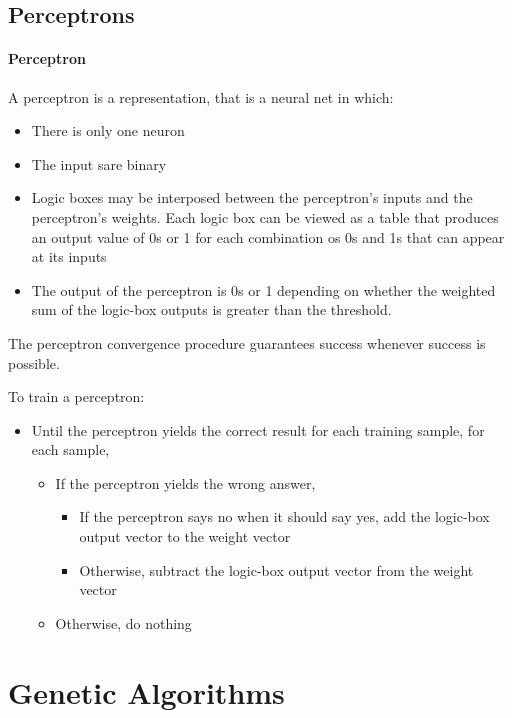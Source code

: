 \documentclass{article}
\begin{document}
\subsection{Perceptrons}

\paragraph{Perceptron} A perceptron is a representation, that is a
neural net in which:
\begin{itemize}
  \item There is only one neuron
  \item The input sare binary
  \item Logic boxes may be interposed between the perceptron's
    inputs and the perceptron's weights. Each logic box can be
    viewed as a table that produces an output value of 0s or 1 for
    each combination os 0s and 1s that can appear at its inputs
  \item The output of the perceptron is 0s or 1 depending on
    whether the weighted sum of the logic-box outputs is greater
    than the threshold.
\end{itemize}

The perceptron convergence procedure guarantees success whenever
success is possible.

To train a perceptron:
\begin{itemize}
  \item Until the perceptron yields the correct result for each
    training sample, for each sample,
    \begin{itemize}
      \item If the perceptron yields the wrong answer,
        \begin{itemize}
          \item If the perceptron says no when it should say yes,
            add the logic-box output vector to the weight vector
          \item Otherwise, subtract the logic-box output vector
            from the weight vector
        \end{itemize}
      \item Otherwise, do nothing
    \end{itemize}
\end{itemize}

\section{Genetic Algorithms}
\end{document}
